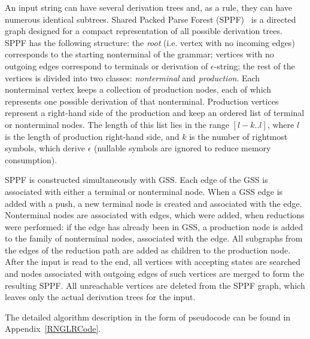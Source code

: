 An input string can have several derivation trees and, as a rule, they can have 
numerous identical subtrees. Shared Packed Parse Forest (SPPF)~\cite{SPPF} is a directed graph
designed for a compact representation of all possible derivation trees.  
SPPF has the following structure: the \emph{root} (i.e. vertex with no incoming edges) corresponds 
to the starting nonterminal of the grammar; vertices with no outgoing edges correspond to terminals 
or derivation of $\epsilon$-string; the rest of the vertices is divided into two classes: \emph{nonterminal} 
and \emph{production}. Each nonterminal vertex keeps a collection of production nodes, each of which represents one  
possible derivation of that nonterminal. Production vertices represent a right-hand side of the 
production and keep an ordered list of terminal or nonterminal nodes. The length of this list lies
in the range $[l-k..l]$, where $l$ is the length of production right-hand side, and $k$ is 
the number of rightmost symbols, which derive $\epsilon$ (nullable symbols are ignored to reduce memory consumption).

SPPF is constructed simultaneously with GSS. Each edge of the GSS is associated with either 
a terminal or nonterminal node. When a GSS edge is added with a push, 
a new terminal node is created and associated with the edge. Nonterminal nodes are associated
with edges, which were added, when reductions were performed: if the edge has already been in GSS, 
a production node is added to the family of nonterminal nodes, associated with the edge. All subgraphs 
from the edges of the reduction path are added as children to the production node. After the input 
is read to the end, all vertices with accepting states are searched and nodes associated with 
outgoing edges of such vertices are merged to form the resulting SPPF. All unreachable vertices 
are deleted from the SPPF graph, which leaves only the actual derivation trees for the input.

The detailed algorithm description in the form of pseudocode can be found in Appendix~\ref{RNGLRCode}.
